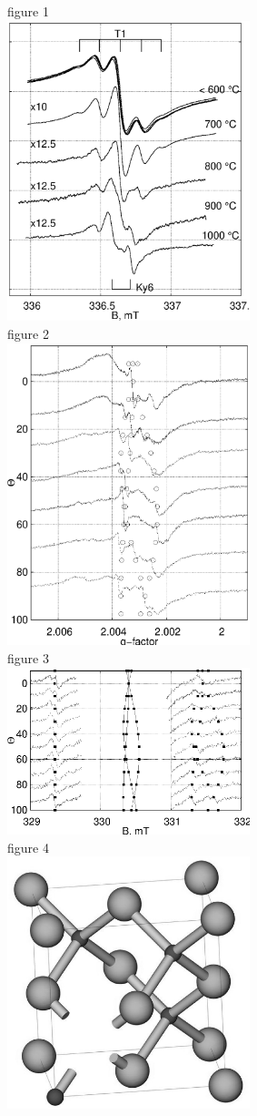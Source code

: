 figure 1\\
\includegraphics[width=200pt]{images/g1.eps}\mbox{}\\
figure 2\\
\includegraphics[width=200pt]{images/g2.eps}\mbox{}\\
figure 3\\
\includegraphics[width=200pt]{images/g3.eps}\mbox{}\\
figure 4\\
\includegraphics[width=200pt]{images/g4.eps}
